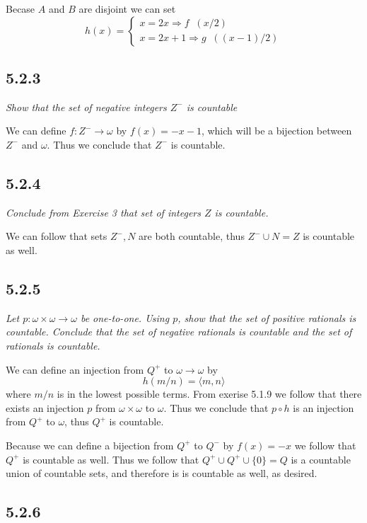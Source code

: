 \documentclass[11pt,oneside,titlepage]{book}
\DeclareMathOperator \inv {^{-1}}
\DeclareMathOperator \ra {\Rightarrow}
\newcommand{\eangle}[1]{\langle #1 \rangle}
\begin{document}
Becase $A$ and $B$ are disjoint we can set
$$h(x) =
\begin{cases}
  x = 2x \ra f\inv(x / 2) \\
  x = 2x + 1 \ra g\inv((x - 1) / 2) 
\end{cases}
$$

\subsection*{5.2.3}

\textit{Show that the set of negative integers $Z^-$ is countable}

We can define $f: Z^- \to \omega$ by $f(x) = -x - 1$, which will be a bijection between
$Z^-$ and $\omega$. Thus we conclude that $Z^-$ is countable.

\subsection*{5.2.4}

\textit{Conclude from Exercise 3 that set of integers $Z$ is countable.}

We can follow that sets $Z^-, N$ are both countable, thus $Z^- \cup N = Z$ is countable as well.

\subsection*{5.2.5}

\textit{Let $p: \omega \times \omega \to \omega$ be one-to-one. Using $p$, show that
  the set of positive rationals is countable. Conclude that the set of negative rationals
  is countable and the set of rationals is countable.}

We can define an injection from $Q^+$ to $\omega \to \omega$ by
$$h(m/n) = \eangle{m, n}$$
where $m/n$ is in the lowest possible terms.
From exerise 5.1.9 we follow that there exists an injection $p$ from $\omega \times \omega$
to $\omega$. Thus we conclude that $p \circ h$ is an injection from $Q^+$ to $\omega$, thus
$Q^+$ is countable.

Because we can define a bijection from $Q^+$ to $Q^-$ by $f(x) = -x$ we follow that $Q^+$
is countable as well. Thus we follow that $Q^+ \cup Q^+ \cup \{0\} = Q$ is a countable union
of countable sets, and therefore is is countable as well, as desired.

\subsection*{5.2.6}
\end{document}
